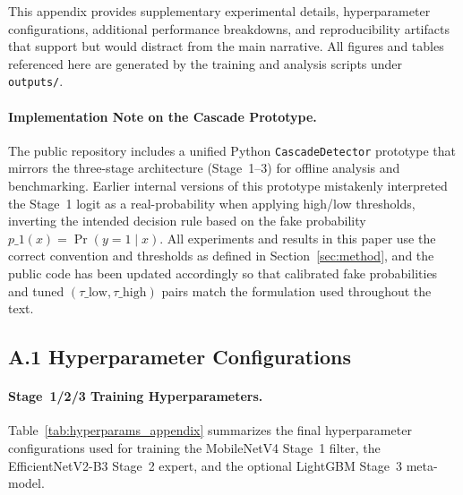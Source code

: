 This appendix provides supplementary experimental details, hyperparameter configurations, additional performance breakdowns, and reproducibility artifacts that support but would distract from the main narrative. All figures and tables referenced here are generated by the training and analysis scripts under \texttt{outputs/}.

\paragraph{Implementation Note on the Cascade Prototype.}
The public repository includes a unified Python \texttt{CascadeDetector} prototype that mirrors the three\hyp stage architecture (Stage~1–3) for offline analysis and benchmarking. Earlier internal versions of this prototype mistakenly interpreted the Stage~1 logit as a real\hyp probability when applying high/low thresholds, inverting the intended decision rule based on the fake probability $p\_1(x)=\Pr(y=1\mid x)$. All experiments and results in this paper use the correct convention and thresholds as defined in Section~\ref{sec:method}, and the public code has been updated accordingly so that calibrated fake probabilities and tuned $(\tau\_{\mathrm{low}},\tau\_{\mathrm{high}})$ pairs match the formulation used throughout the text.

\subsection*{A.1 Hyperparameter Configurations}

\paragraph{Stage~1/2/3 Training Hyperparameters.}
Table~\ref{tab:hyperparams_appendix} summarizes the final hyperparameter configurations used for training the MobileNetV4 Stage~1 filter, the EfficientNetV2\hyp B3 Stage~2 expert, and the optional LightGBM Stage~3 meta\hyp model.

